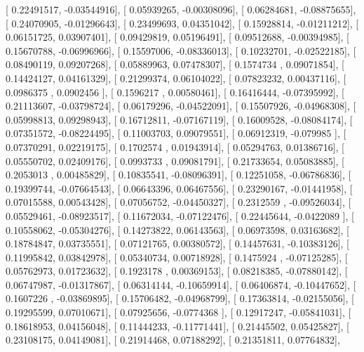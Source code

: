 \documentclass{article}
\begin{document}
       [ 0.22491517, -0.03544916],
       [ 0.05939265, -0.00308096],
       [ 0.06284681, -0.08875655],
       [ 0.24070905, -0.01296643],
       [ 0.23499693,  0.04351042],
       [ 0.15928814, -0.01211212],
       [ 0.06151725,  0.03907401],
       [ 0.09429819,  0.05196491],
       [ 0.09512688, -0.00394985],
       [ 0.15670788, -0.06996966],
       [ 0.15597006, -0.08336013],
       [ 0.10232701, -0.02522185],
       [ 0.08490119,  0.09207268],
       [ 0.05889963,  0.07478307],
       [ 0.1574734 ,  0.09071854],
       [ 0.14424127,  0.04161329],
       [ 0.21299374,  0.06104022],
       [ 0.07823232,  0.00437116],
       [ 0.0986375 ,  0.0902456 ],
       [ 0.1596217 ,  0.00580461],
       [ 0.16416444, -0.07395992],
       [ 0.21113607, -0.03798724],
       [ 0.06179296, -0.04522091],
       [ 0.15507926, -0.04968308],
       [ 0.05998813,  0.09298943],
       [ 0.16712811, -0.07167119],
       [ 0.16009528, -0.08084174],
       [ 0.07351572, -0.08224495],
       [ 0.11003703,  0.09079551],
       [ 0.06912319, -0.079985  ],
       [ 0.07370291,  0.02219175],
       [ 0.1702574 ,  0.01943914],
       [ 0.05294763,  0.01386716],
       [ 0.05550702,  0.02409176],
       [ 0.0993733 ,  0.09081791],
       [ 0.21733654,  0.05083885],
       [ 0.2053013 ,  0.00485829],
       [ 0.10835541, -0.08096391],
       [ 0.12251058, -0.06786836],
       [ 0.19399744, -0.07664543],
       [ 0.06643396,  0.06467556],
       [ 0.23290167, -0.01441958],
       [ 0.07015588,  0.00543428],
       [ 0.07056752, -0.04450327],
       [ 0.2312559 , -0.09526034],
       [ 0.05529461, -0.08923517],
       [ 0.11672034, -0.07122476],
       [ 0.22445644, -0.0422089 ],
       [ 0.10558062, -0.05304276],
       [ 0.14273822,  0.06143563],
       [ 0.06973598,  0.03163682],
       [ 0.18784847,  0.03735551],
       [ 0.07121765,  0.00380572],
       [ 0.14457631, -0.10383126],
       [ 0.11995842,  0.03842978],
       [ 0.05340734,  0.00718928],
       [ 0.1475924 , -0.07125285],
       [ 0.05762973,  0.01723632],
       [ 0.1923178 ,  0.00369153],
       [ 0.08218385, -0.07880142],
       [ 0.06747987, -0.01317867],
       [ 0.06314144, -0.10659914],
       [ 0.06406874, -0.10447652],
       [ 0.1607226 , -0.03869895],
       [ 0.15706482, -0.04968799],
       [ 0.17363814, -0.02155056],
       [ 0.19295599,  0.07010671],
       [ 0.07925656, -0.0774368 ],
       [ 0.12917247, -0.05841031],
       [ 0.18618953,  0.04156048],
       [ 0.11444233, -0.11771441],
       [ 0.21445502,  0.05425827],
       [ 0.23108175,  0.04149081],
       [ 0.21914468,  0.07188292],
       [ 0.21351811,  0.07764832],
\end{document}
